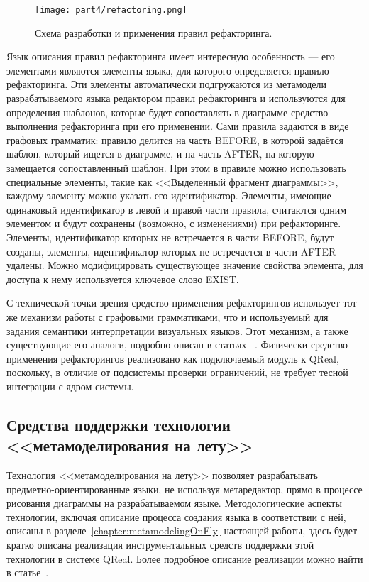 \begin{figure} [ht]
	\begin{center}
		\texttt{[image: part4/refactoring.png]}
		\caption{Схема разработки и применения правил рефакторинга.}
		\label{image:refactoring}
	\end{center}
\end{figure}

Язык описания правил рефакторинга имеет интересную особенность --- его элементами 
являются элементы языка, для которого определяется правило рефакторинга. Эти элементы 
автоматически подгружаются из метамодели разрабатываемого языка редактором правил 
рефакторинга и используются для определения шаблонов, которые будет сопоставлять в 
диаграмме средство выполнения рефакторинга при его применении. Сами правила задаются 
в виде графовых грамматик: правило делится на часть BEFORE, в которой задаётся шаблон, 
который ищется в диаграмме, и на часть AFTER, на которую замещается сопоставленный 
шаблон. При этом в правиле можно использовать специальные элементы, такие как <<Выделенный 
фрагмент диаграммы>>, каждому элементу можно указать его идентификатор. Элементы, 
имеющие одинаковый идентификатор в левой и правой части правила, считаются одним элементом 
и будут сохранены (возможно, с изменениями) при рефакторинге. Элементы, идентификатор 
которых не встречается в части BEFORE, будут созданы, элементы, идентификатор которых 
не встречается в части AFTER --- удалены. Можно модифицировать существующее значение 
свойства элемента, для доступа к нему используется ключевое слово EXIST. 

С технической точки зрения средство применения рефакторингов использует тот же механизм 
работы с графовыми грамматиками, что и используемый для задания семантики интерпретации 
визуальных языков. Этот механизм, а также существующие его аналоги, подробно описан в статьях%
~\cite{polyakov2013interpreters, polyakov2013semantics, polyakov2012semantics, polyakov2012interpreter}.
Физически средство применения рефакторингов реализовано как подключаемый модуль к 
QReal, поскольку, в отличие от подсистемы проверки ограничений, не требует тесной 
интеграции с ядром системы.

\subsection{Средства поддержки технологии <<метамоделирования на лету>>}
Технология <<метамоделирования на лету>> позволяет разрабатывать предметно-ориентированные 
языки, не используя метаредактор, прямо в процессе рисования диаграммы на разрабатываемом 
языке. Методологические аспекты технологии, включая описание процесса создания языка 
в соответствии с ней, описаны в разделе~\ref{chapter:metamodelingOnFly} настоящей 
работы, здесь будет кратко описана реализация инструментальных средств поддержки этой 
технологии в системе QReal. Более подробное описание реализации можно найти в статье~\cite{ptakhina2013metamodeling}.

